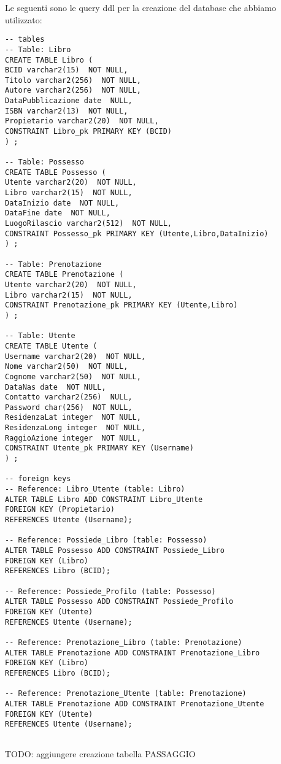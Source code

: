 Le seguenti sono le query ddl per la creazione del database che abbiamo utilizzato:
\begin{lstlisting}
-- tables
-- Table: Libro
CREATE TABLE Libro (
BCID varchar2(15)  NOT NULL,
Titolo varchar2(256)  NOT NULL,
Autore varchar2(256)  NOT NULL,
DataPubblicazione date  NULL,
ISBN varchar2(13)  NOT NULL,
Propietario varchar2(20)  NOT NULL,
CONSTRAINT Libro_pk PRIMARY KEY (BCID)
) ;

-- Table: Possesso
CREATE TABLE Possesso (
Utente varchar2(20)  NOT NULL,
Libro varchar2(15)  NOT NULL,
DataInizio date  NOT NULL,
DataFine date  NOT NULL,
LuogoRilascio varchar2(512)  NOT NULL,
CONSTRAINT Possesso_pk PRIMARY KEY (Utente,Libro,DataInizio)
) ;

-- Table: Prenotazione
CREATE TABLE Prenotazione (
Utente varchar2(20)  NOT NULL,
Libro varchar2(15)  NOT NULL,
CONSTRAINT Prenotazione_pk PRIMARY KEY (Utente,Libro)
) ;

-- Table: Utente
CREATE TABLE Utente (
Username varchar2(20)  NOT NULL,
Nome varchar2(50)  NOT NULL,
Cognome varchar2(50)  NOT NULL,
DataNas date  NOT NULL,
Contatto varchar2(256)  NULL,
Password char(256)  NOT NULL,
ResidenzaLat integer  NOT NULL,
ResidenzaLong integer  NOT NULL,
RaggioAzione integer  NOT NULL,
CONSTRAINT Utente_pk PRIMARY KEY (Username)
) ;

-- foreign keys
-- Reference: Libro_Utente (table: Libro)
ALTER TABLE Libro ADD CONSTRAINT Libro_Utente
FOREIGN KEY (Propietario)
REFERENCES Utente (Username);

-- Reference: Possiede_Libro (table: Possesso)
ALTER TABLE Possesso ADD CONSTRAINT Possiede_Libro
FOREIGN KEY (Libro)
REFERENCES Libro (BCID);

-- Reference: Possiede_Profilo (table: Possesso)
ALTER TABLE Possesso ADD CONSTRAINT Possiede_Profilo
FOREIGN KEY (Utente)
REFERENCES Utente (Username);

-- Reference: Prenotazione_Libro (table: Prenotazione)
ALTER TABLE Prenotazione ADD CONSTRAINT Prenotazione_Libro
FOREIGN KEY (Libro)
REFERENCES Libro (BCID);

-- Reference: Prenotazione_Utente (table: Prenotazione)
ALTER TABLE Prenotazione ADD CONSTRAINT Prenotazione_Utente
FOREIGN KEY (Utente)
REFERENCES Utente (Username);


\end{lstlisting}

TODO: aggiungere creazione tabella PASSAGGIO
